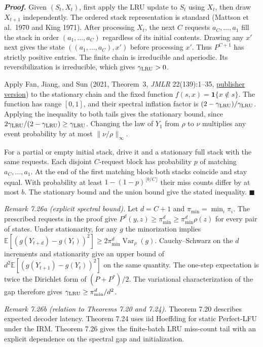 \documentclass[
]{article}
\begin{document}
\emph{\textbf{Proof.}}
Given $(S_t,X_t)$, first apply the LRU update to $S_t$ using $X_t$,
then draw $X_{t+1}$ independently. The ordered stack representation
is standard (Mattson et al.\ 1970 and King 1971).
After processing $X_t$, the next $C$ requests $a_C,\ldots,a_1$ fill
the stack in order $(a_1,\ldots,a_C)$ regardless of its initial
contents. Drawing any $x'$ next gives the state $((a_1,\ldots,a_C),x')$
before processing $x'$. Thus $P^{C+1}$ has strictly positive entries.
The finite chain is irreducible and aperiodic. Its reversibilization
is irreducible, which gives $\gamma_{\rm LRU}>0$.

Apply Fan, Jiang, and Sun (2021, Theorem~3, \emph{JMLR}
22(139):1--35, \href{https://jmlr.org/papers/v22/19-479.html}{publisher
version}) to the stationary chain and the fixed function
$f(s,x)=\mathbf{1}\{x\notin s\}$. The function has range $[0,1]$,
and their spectral inflation factor is
$(2-\gamma_{\rm LRU})/\gamma_{\rm LRU}$.
Applying the inequality to both tails gives the stationary bound,
since $2\gamma_{\rm LRU}/(2-\gamma_{\rm LRU})\geq\gamma_{\rm LRU}$.
Changing the law of $Y_1$ from $\rho$ to $\nu$ multiplies any event
probability by at most $\|\nu/\rho\|_\infty$.

For a partial or empty initial stack, drive it and a stationary
full stack with the same requests. Each disjoint $C$-request block
has probability $p$ of matching $a_C,\ldots,a_1$. At the end of
the first matching block both stacks coincide and stay equal.
With probability at least $1-(1-p)^{\lfloor b/C\rfloor}$ their miss
counts differ by at most $b$. The stationary bound and the union
bound give the stated inequality. \hfill$\blacksquare$

\emph{Remark 7.26a (explicit spectral bound).} Let $d=C+1$ and
$\pi_{\min}=\min_i\pi_i$. The prescribed requests in the proof give
$P^d(y,z)\geq\pi_{\min}^d\geq\pi_{\min}^d\rho(z)$ for every
pair of states. Under stationarity, for any $g$ the minorization
implies
$\mathbb E[(g(Y_{t+d})-g(Y_t))^2]\geq 2\pi_{\min}^d\operatorname{Var}_\rho(g)$.
Cauchy--Schwarz on the $d$ increments and stationarity give an
upper bound of $d^2\mathbb E[(g(Y_{t+1})-g(Y_t))^2]$ on the same
quantity. The one-step expectation is twice the Dirichlet form of
$(P+P^*)/2$. The variational characterization of the gap therefore
gives $\gamma_{\rm LRU}\geq\pi_{\min}^d/d^2$.

\emph{Remark 7.26b (relation to Theorems 7.20 and 7.24).}
Theorem 7.20 describes expected decoder latency. Theorem 7.24
uses iid Hoeffding for static Perfect-LFU under the IRM.
Theorem 7.26 gives the finite-batch LRU miss-count tail with
an explicit dependence on the spectral gap and initialization.
\end{document}
